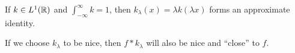 \begin{exercise}
  If $k \in L^1(\mathbb{R})$ and
  $\int_{-\infty}^\infty k = 1$, then
  $k_\lambda(x) = \lambda k(\lambda x)$
  forms an approximate identity.
\end{exercise}

\begin{remark}
  If we choose $k_{\lambda}$ to be nice,
  then $f * k_\lambda$ will also be nice and
  ``close'' to $f$.
\end{remark}
